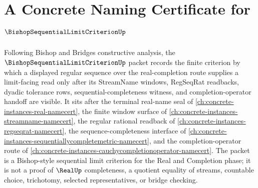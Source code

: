 \chapter{A Concrete Naming Certificate for $\BishopSequentialLimitCriterionUp$}
\label{ch:concrete-instances-bishop-sequential-limit-criterion-namecert}

Following Bishop and Bridges constructive analysis, the $\BishopSequentialLimitCriterionUp$ packet records the finite criterion by which a displayed regular sequence over the real-completion route supplies a limit-facing read only after its StreamName windows, RegSeqRat readbacks, dyadic tolerance rows, sequential-completeness witness, and completion-operator handoff are visible. It sits after the terminal real-name seal of \autoref{ch:concrete-instances-real-namecert}, the finite window surface of \autoref{ch:concrete-instances-streamname-namecert}, the regular rational readback of \autoref{ch:concrete-instances-regseqrat-namecert}, the sequence-completeness interface of \autoref{ch:concrete-instances-sequentiallycompletemetric-namecert}, and the completion-operator route of \autoref{ch:concrete-instances-cauchycompletionoperator-namecert}. The packet is a Bishop-style sequential limit criterion for the Real and Completion phase; it is not a proof of $\RealUp$ completeness, a quotient equality of streams, countable choice, trichotomy, selected representatives, or bridge checking.


